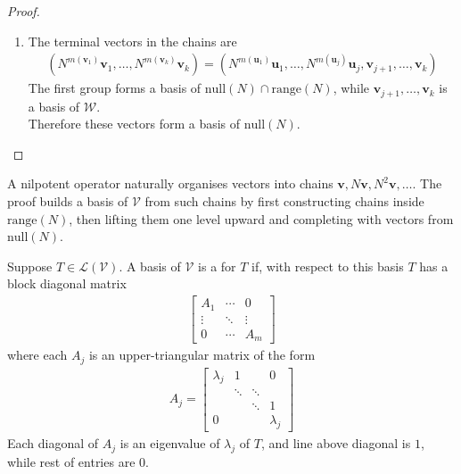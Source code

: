 \begin{lemma}
\begin{proof}
\begin{enumerate}[label=\roman*.]
Linear independence follows as applying $N$ to a linear relation reduces it to a relation among inductively constructed basis vectors in $\text{range}(N)$. Remaining terms lie in $(\text{null}(N) \cap \text{range}(N)) \oplus \mathcal{W}$, forcing all coefficients to vanish. The number of vectors listed equals $\text{dim}(\text{range}(N)) + \text{dim}(\text{null}(N)) = \text{dim}(\mathcal{V})$ by Rank-Nullity Theorem \ref{thm:ranknullitythm}. Hence the list is a basis of $\mathcal{V}$.
\item[$(ii)$] The terminal vectors in the chains are
\begin{align}
(N^{m(\mathbf{v}_1)}\mathbf{v}_1, \ldots, N^{m(\mathbf{v}_k)}\mathbf{v}_k) = (N^{m(\mathbf{u}_1)}\mathbf{u}_1, \ldots, N^{m(\mathbf{u}_j)}\mathbf{u}_j, \mathbf{v}_{j+1}, \ldots, \mathbf{v}_k) \nonumber
\end{align}
The first group forms a basis of $\text{null}(N) \cap \text{range}(N)$, while $\mathbf{v}_{j+1}, \ldots, \mathbf{v}_k$ is a basis of $\mathcal{W}$.\\
Therefore these vectors form a basis of $\text{null}(N)$.
\end{enumerate}
\end{proof}
\end{lemma}

A nilpotent operator naturally organises vectors into chains $\mathbf{v}, N \mathbf{v}, N^2 \mathbf{v}, \ldots$. The proof builds a basis of $\mathcal{V}$ from such chains by first constructing chains inside $\text{range}(N)$, then lifting them one level upward and completing with vectors from $\text{null}(N)$.

\begin{definition} Suppose $T \in \mathcal{L}(\mathcal{V})$. A basis of $\mathcal{V}$ is a  for $T$ if, with respect to this basis $T$ has a block diagonal matrix
\begin{align}
\begin{bmatrix}
A_1 & \cdots & 0 \\
\vdots & \ddots & \vdots \\
0 & \cdots & A_m
\end{bmatrix} \nonumber
\end{align}
where each $A_j$ is an upper-triangular matrix of the form
\begin{align}
A_j = 
\begin{bmatrix}
\lambda_j & 1 & & 0 \\
& \ddots & \ddots & \\
& & \ddots & 1 \\
0 & & & \lambda_j
\end{bmatrix} \nonumber
\end{align}
Each diagonal of $A_j$ is an eigenvalue of $\lambda_j$ of $T$, and line above diagonal is $1$, while rest of entries are $0$.
\end{definition}

